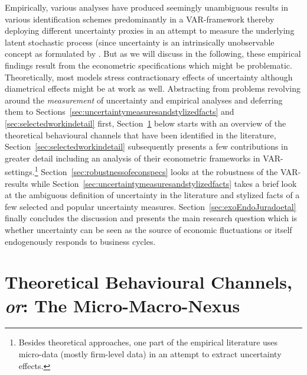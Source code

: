 \documentclass[a4paper,11pt,listof=nochaptergap,oneside,pointednumbers,bibtotoc,bigheadings,liststotoc,hidelinks]{scrbook}
\theoremstyle{mysatz}
\theoremstyle{mydefinition}
\theoremstyle{mytheorem}
\theoremstyle{mybemerkung}
\begin{document}
Empirically, various analyses have produced seemingly unambiguous results in various identification schemes predominantly in a VAR-framework thereby deploying different uncertainty proxies in an attempt to measure the underlying latent stochastic process (since uncertainty is an intrinsically unobservable concept as formulated by \citep{bloom:14}. But as we will discuss in the following, these empirical findings result from the econometric specifications which might be problematic. Theoretically, most models stress contractionary effects of uncertainty although diametrical effects might be at work as well. Abstracting from problems revolving around the \textit{measurement} of uncertainty and empirical analyses and deferring them to Sections~\ref{sec:uncertaintymeasuresandstylizedfacts} and \ref{sec:selectedworkindetail} first, Section~\ref{sec:studiedeffectsinrelatedliterature} below starts with an overview of the theoretical behavioural channels that have been identified in the literature, Section~\ref{sec:selectedworkindetail} subsequently presents a few contributions in greater detail including an analysis of their econometric frameworks in VAR-settings.\footnote{Besides theoretical approaches, one part of the empirical literature uses micro-data (mostly firm-level data) in an attempt to extract uncertainty effects.} Section~\ref{sec:robustnessofeconspecs} looks at the robustness of the VAR-results while Section~\ref{sec:uncertaintymeasuresandstylizedfacts} takes a brief look at the ambiguous definition of uncertainty in the literature and stylized facts of a few selected and popular uncertainty measures. Section~\ref{sec:exoEndoJuradoetal} finally concludes the discussion and presents the main research question which is whether uncertainty can be seen as the source of economic fluctuations or itself endogenously responds to business cycles.


\section[Theoretical Behavioural Channels, \textit{or}: The Micro-Macro-Nexus]{Theoretical Behavioural Channels, \textit{or}: The Micro-Macro-Nexus}
\label{sec:studiedeffectsinrelatedliterature}
\end{document}
